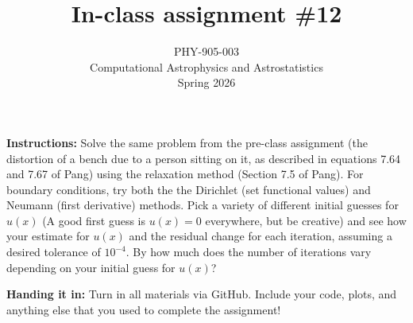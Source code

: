 \documentclass[10pt]{article}
\title{In-class assignment \#12}
\author{PHY-905-003\\Computational Astrophysics and
  Astrostatistics\\Spring 2026}
\date{} %
\begin{document}
 
\maketitle


\vspace{-5mm}

\noindent \textbf{Instructions:} Solve the same problem from the
pre-class assignment (the distortion of a bench due to a person
sitting on it, as described in equations 7.64 and 7.67 of Pang) using
the relaxation method (Section 7.5 of Pang).  For boundary conditions,
try both the the Dirichlet (set functional values) and Neumann (first
derivative) methods.
 Pick a variety of different initial guesses for $u(x)$ (A
good first guess is $u(x) = 0$ everywhere, but be creative) and see
how your estimate for $u(x)$ and the residual change for each
iteration, assuming a desired tolerance of $10^{-4}$.  By how much
does the number of iterations vary depending on your initial guess for
$u(x)$?


\vspace{5mm}

\noindent \textbf{Handing it in:}   Turn in all materials via GitHub.
Include your code, plots, and anything else that you used to complete
the assignment!
\end{document}
